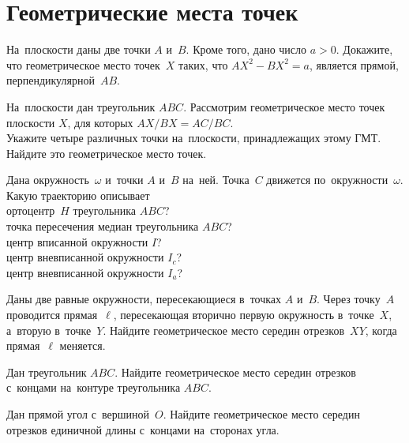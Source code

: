 
\section*{Геометрические места точек}


\begin{problems}

\item
На~плоскости даны две точки $A$ и~$B$.
Кроме того, дано число $a > 0$.
Докажите, что геометрическое место точек~$X$ таких, что $AX^2 - BX^2 = a$,
является прямой, перпендикулярной~$AB$.

\item
На~плоскости дан треугольник $ABC$.
Рассмотрим геометрическое место точек плоскости $X$, для которых
$AX / BX = AC / BC$.
\\
\subproblem
Укажите четыре различных точки на~плоскости, принадлежащих этому ГМТ.
\\
\subproblem
Найдите это геометрическое место точек.

\item
Дана окружность~$\omega$ и~точки $A$ и~$B$ на~ней.
Точка~$C$ движется по~окружности~$\omega$.
Какую траекторию описывает
\\
\subproblem ортоцентр~$H$ треугольника $ABC$?
\\
\subproblem точка пересечения медиан треугольника $ABC$?
\\
\subproblem центр вписанной окружности $I$?
\\
\subproblem центр вневписанной окружности $I_{c}$?
\\
\subproblem центр вневписанной окружности $I_{a}$?

\item
Даны две равные окружности, пересекающиеся в~точках $A$ и~$B$.
Через точку~$A$ проводится прямая~$\ell$, пересекающая вторично первую
окружность в~точке~$X$, а~вторую в~точке~$Y$.
Найдите геометрическое место середин отрезков~$XY$, когда прямая~$\ell$
меняется.

\item
Дан треугольник $ABC$.
Найдите геометрическое место середин отрезков с~концами на~контуре
треугольника $ABC$.

\item
Дан прямой угол с~вершиной~$O$.
Найдите геометрическое место середин отрезков единичной длины с~концами
на~сторонах угла.

\end{problems}

